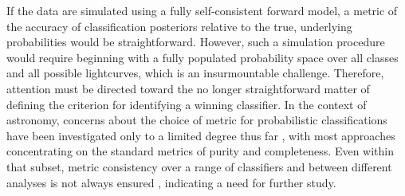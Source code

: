 If the data are simulated using a fully self-consistent forward model, a metric of the accuracy of classification posteriors relative to the true, underlying probabilities would be straightforward.
However, such a simulation procedure would require beginning with a fully populated probability space over all classes and all possible lightcurves, which is an insurmountable challenge.
Therefore, attention must be directed toward the no longer straightforward matter of defining the criterion for identifying a winning classifier.
In the context of astronomy, concerns about the choice of metric for probabilistic classifications have been investigated only to a limited degree thus far \citep{florios_forecasting_2018, kim_stargalaxy_2017},
with most approaches concentrating on the standard metrics of purity and completeness.
Even within that subset, metric consistency over a range of classifiers and between different analyses is not always ensured \citep{bethapudi_separation_2018}, indicating a need for further study.


